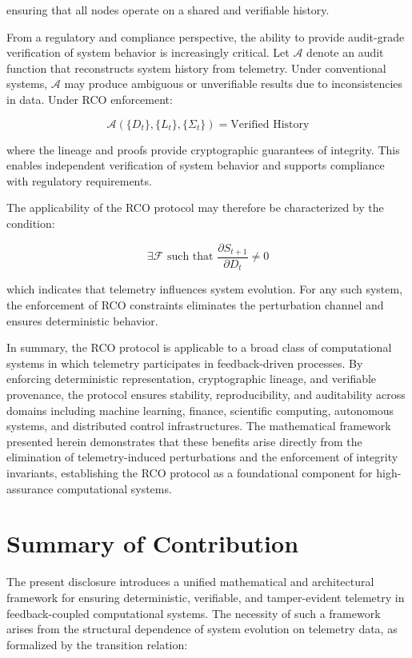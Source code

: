 ensuring that all nodes operate on a shared and verifiable history.

From a regulatory and compliance perspective, the ability to provide audit-grade verification of system behavior is increasingly critical. Let $\mathcal{A}$ denote an audit function that reconstructs system history from telemetry. Under conventional systems, $\mathcal{A}$ may produce ambiguous or unverifiable results due to inconsistencies in data. Under RCO enforcement:

\begin{equation}
\mathcal{A}(\{D_t\}, \{L_t\}, \{\Sigma_t\}) = \text{Verified History}
\end{equation}

where the lineage and proofs provide cryptographic guarantees of integrity. This enables independent verification of system behavior and supports compliance with regulatory requirements.

The applicability of the RCO protocol may therefore be characterized by the condition:

\begin{equation}
\exists \mathcal{F} \text{ such that } \frac{\partial S_{t+1}}{\partial D_t} \neq 0
\end{equation}

which indicates that telemetry influences system evolution. For any such system, the enforcement of RCO constraints eliminates the perturbation channel and ensures deterministic behavior.

In summary, the RCO protocol is applicable to a broad class of computational systems in which telemetry participates in feedback-driven processes. By enforcing deterministic representation, cryptographic lineage, and verifiable provenance, the protocol ensures stability, reproducibility, and auditability across domains including machine learning, finance, scientific computing, autonomous systems, and distributed control infrastructures. The mathematical framework presented herein demonstrates that these benefits arise directly from the elimination of telemetry-induced perturbations and the enforcement of integrity invariants, establishing the RCO protocol as a foundational component for high-assurance computational systems.

\section{Summary of Contribution}

The present disclosure introduces a unified mathematical and architectural framework for ensuring deterministic, verifiable, and tamper-evident telemetry in feedback-coupled computational systems. The necessity of such a framework arises from the structural dependence of system evolution on telemetry data, as formalized by the transition relation:

